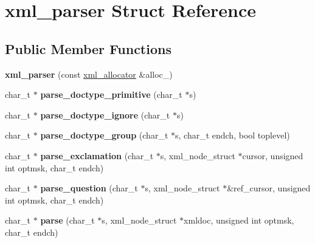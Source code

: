 \hypertarget{structxml__parser}{\section{xml\-\_\-parser Struct Reference}
\label{structxml__parser}
}
\subsection*{Public Member Functions}
\begin{DoxyCompactItemize}
\item 
\hypertarget{structxml__parser_acc030c4ed339b238e1ff2d3e6fa7188b}{{\bfseries xml\-\_\-parser} (const \hyperlink{structxml__allocator}{xml\-\_\-allocator} \&alloc\-\_\-)}\label{structxml__parser_acc030c4ed339b238e1ff2d3e6fa7188b}

\item 
\hypertarget{structxml__parser_a722853b603ad9a1d1f61bb8115bea5b4}{char\-\_\-t $\ast$ {\bfseries parse\-\_\-doctype\-\_\-primitive} (char\-\_\-t $\ast$s)}\label{structxml__parser_a722853b603ad9a1d1f61bb8115bea5b4}

\item 
\hypertarget{structxml__parser_a1e996ac9c9993f1939128859596376a1}{char\-\_\-t $\ast$ {\bfseries parse\-\_\-doctype\-\_\-ignore} (char\-\_\-t $\ast$s)}\label{structxml__parser_a1e996ac9c9993f1939128859596376a1}

\item 
\hypertarget{structxml__parser_a9bc0e5f3d75cd7edb267a85430e1cdfc}{char\-\_\-t $\ast$ {\bfseries parse\-\_\-doctype\-\_\-group} (char\-\_\-t $\ast$s, char\-\_\-t endch, bool toplevel)}\label{structxml__parser_a9bc0e5f3d75cd7edb267a85430e1cdfc}

\item 
\hypertarget{structxml__parser_a40da52e4b27a0a06752930a0edf16fe9}{char\-\_\-t $\ast$ {\bfseries parse\-\_\-exclamation} (char\-\_\-t $\ast$s, xml\-\_\-node\-\_\-struct $\ast$cursor, unsigned int optmsk, char\-\_\-t endch)}\label{structxml__parser_a40da52e4b27a0a06752930a0edf16fe9}

\item 
\hypertarget{structxml__parser_a2b0edc4fbf2ff448b4d5b31593c5c4fd}{char\-\_\-t $\ast$ {\bfseries parse\-\_\-question} (char\-\_\-t $\ast$s, xml\-\_\-node\-\_\-struct $\ast$\&ref\-\_\-cursor, unsigned int optmsk, char\-\_\-t endch)}\label{structxml__parser_a2b0edc4fbf2ff448b4d5b31593c5c4fd}

\item 
\hypertarget{structxml__parser_a00626800a3d535c14273c48238c03a70}{char\-\_\-t $\ast$ {\bfseries parse} (char\-\_\-t $\ast$s, xml\-\_\-node\-\_\-struct $\ast$xmldoc, unsigned int optmsk, char\-\_\-t endch)}\label{structxml__parser_a00626800a3d535c14273c48238c03a70}

\end{DoxyCompactItemize}
